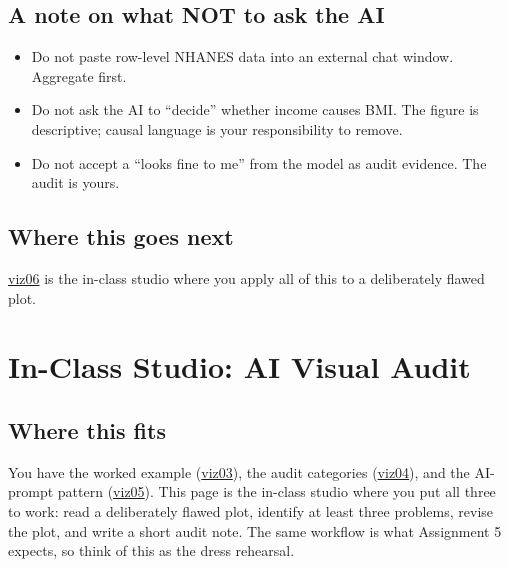 \documentclass[
  letterpaper,
  DIV=11,
  numbers=noendperiod,
  oneside]{scrreprt}
\providecommand{\tightlist}{%
  \setlength{\itemsep}{0pt}\setlength{\parskip}{0pt}}
\begin{document}
\section*{A note on what NOT to ask the
AI}\label{a-note-on-what-not-to-ask-the-ai}


\begin{itemize}
\tightlist
\item
  Do not paste row-level NHANES data into an external chat window.
  Aggregate first.
\item
  Do not ask the AI to ``decide'' whether income causes BMI. The figure
  is descriptive; causal language is your responsibility to remove.
\item
  Do not accept a ``looks fine to me'' from the model as audit evidence.
  The audit is yours.
\end{itemize}

\section*{Where this goes next}\label{where-this-goes-next-4}


\href{viz06-studio-visual-audit.qmd}{viz06} is the in-class studio where
you apply all of this to a deliberately flawed plot.

\chapter*{In-Class Studio: AI Visual
Audit}\label{in-class-studio-ai-visual-audit}


\section*{Where this fits}\label{where-this-fits-4}


You have the worked example
(\hyperref[worked-example-descriptive-bmi-visualization]{viz03}), the
audit categories (\hyperref[how-a-plot-can-mislead]{viz04}), and the
AI-prompt pattern (\hyperref[ai-prompts-you-can-defend]{viz05}). This
page is the in-class studio where you put all three to work: read a
deliberately flawed plot, identify at least three problems, revise the
plot, and write a short audit note. The same workflow is what Assignment
5 expects, so think of this as the dress rehearsal.
\end{document}
